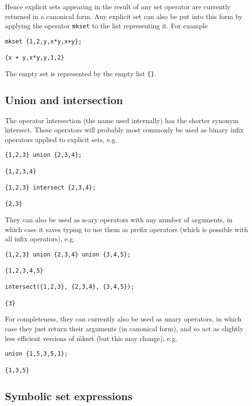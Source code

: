 Hence explicit sets appearing in the result of any set operator are
currently returned in a canonical form.  Any explicit set can also be
put into this form by applying the operator \texttt{mkset} to the list
representing it.  For example
\begin{verbatim}
mkset {1,2,y,x*y,x+y};

{x + y,x*y,y,1,2}
\end{verbatim}

The empty set is represented by the empty list \texttt{\{\}}.


\subsection{Union and intersection}
\hypertarget{operator:SETS_UNION}{}
\hypertarget{operator:INTERSECTION}{}
\hypertarget{operator:SETS_INTERSECT}{}
The operator \f{intersection} (the name used internally) has the
shorter synonym \f{intersect}.  These operators will probably most
commonly be used as binary infix operators applied to explicit sets,
e.g.
\begin{verbatim}
{1,2,3} union {2,3,4};

{1,2,3,4}

{1,2,3} intersect {2,3,4};

{2,3}
\end{verbatim}
They can also be used as n-ary operators with any number of arguments,
in which case it saves typing to use them as prefix operators (which
is possible with all \REDUCE infix operators), e.g.
\begin{verbatim}
{1,2,3} union {2,3,4} union {3,4,5};

{1,2,3,4,5}

intersect({1,2,3}, {2,3,4}, {3,4,5});

{3}
\end{verbatim}
For completeness, they can currently also be used as unary operators,
in which case they just return their arguments (in canonical form),
and so act as slightly less efficient versions of \f{mkset} (but
this may change), e.g.
\begin{verbatim}
union {1,5,3,5,1};

{1,3,5}
\end{verbatim}


\subsection{Symbolic set expressions}

